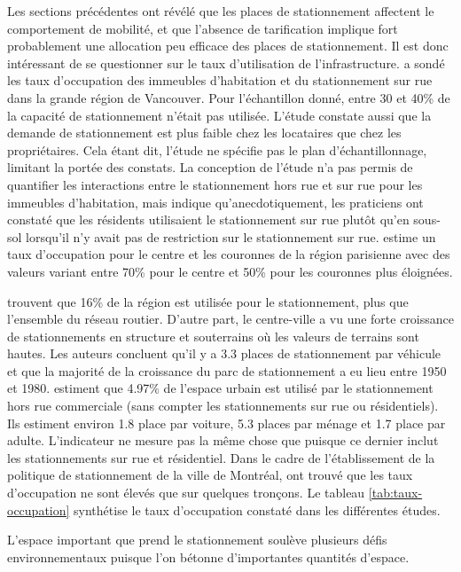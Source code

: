         Les sections précédentes ont révélé que les places de stationnement affectent le comportement de mobilité, et que l'absence de tarification implique fort probablement une allocation peu efficace des places de stationnement. Il est donc intéressant de se questionner sur le taux d'utilisation de l'infrastructure. \textcite{translink_2018_2019} a sondé les taux d'occupation des immeubles d'habitation et du stationnement sur rue dans la grande région de Vancouver. Pour l'échantillon donné, entre 30 et 40\% de la capacité de stationnement n'était pas utilisée. L'étude constate aussi que la demande de stationnement est plus faible chez les locataires que chez les propriétaires. Cela étant dit, l'étude ne spécifie pas le plan d'échantillonnage, limitant la portée des constats. La conception de l'étude n'a pas permis de quantifier les interactions entre le stationnement hors rue et sur rue pour les immeubles d'habitation, mais indique qu'anecdotiquement, les praticiens ont constaté que les résidents utilisaient le stationnement sur rue plutôt qu'en sous-sol lorsqu'il n'y avait pas de restriction sur le stationnement sur rue. \textcite{heran_consommation_2008} estime un taux d'occupation pour le centre et les couronnes de la région parisienne avec des valeurs variant entre 70\% pour le centre et 50\% pour les couronnes plus éloignées.  \par        
        \textcite{chester_parking_2015} trouvent que 16\% de la région est utilisée pour le stationnement, plus que l'ensemble du réseau routier. D'autre part, le centre-ville a vu une forte croissance de stationnements en structure et souterrains où les valeurs de terrains sont hautes. Les auteurs concluent qu'il y a 3.3 places de stationnement par véhicule et que la majorité de la croissance du parc de stationnement a eu lieu entre 1950 et 1980.\textcite{davis_estimating_2010} estiment que 4.97\% de l'espace urbain est utilisé par le stationnement hors rue commerciale (sans compter les stationnements sur rue ou résidentiels). Ils estiment environ 1.8 place par voiture, 5.3 places par ménage et 1.7 place par adulte. L'indicateur ne mesure pas la même chose que \textcite{chester_parking_2015} puisque ce dernier inclut les stationnements sur rue et résidentiel. Dans le cadre de l'établissement de la politique de stationnement de la ville de Montréal, \citeauthor{aignel_elaboration_2015} ont trouvé que les taux d'occupation ne sont élevés que sur quelques tronçons. Le tableau \ref{tab:taux-occupation} synthétise le taux d'occupation constaté dans les différentes études. \par
        L'espace important que prend le stationnement soulève plusieurs défis environnementaux puisque l'on bétonne d'importantes quantités d'espace. 
    
